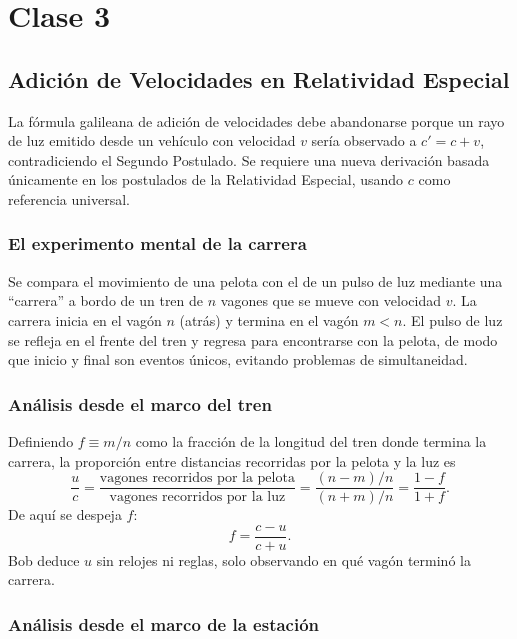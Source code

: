 \chapter{Clase 3}
\section{Adición de Velocidades en Relatividad Especial}

La fórmula galileana de adición de velocidades debe abandonarse porque un rayo de luz emitido desde un vehículo con velocidad $v$ sería observado a $c' = c + v$, contradiciendo el Segundo Postulado. Se requiere una nueva derivación basada únicamente en los postulados de la Relatividad Especial, usando $c$ como referencia universal.

\subsection{El experimento mental de la carrera}

Se compara el movimiento de una pelota con el de un pulso de luz mediante una ``carrera'' a bordo de un tren de $n$ vagones que se mueve con velocidad $v$. La carrera inicia en el vagón $n$ (atrás) y termina en el vagón $m < n$. El pulso de luz se refleja en el frente del tren y regresa para encontrarse con la pelota, de modo que inicio y final son eventos únicos, evitando problemas de simultaneidad.



\subsection{Análisis desde el marco del tren}

Definiendo $f \equiv m/n$ como la fracción de la longitud del tren donde termina la carrera, la proporción entre distancias recorridas por la pelota y la luz es
$$
\frac{u}{c} = \frac{\text{vagones recorridos por la pelota}}{\text{vagones recorridos por la luz}} = \frac{(n-m)/n}{(n+m)/n} = \frac{1 - f}{1 + f}.
$$
De aquí se despeja $f$:
\begin{equation*}
    f = \frac{c-u}{c+u}.
    \tag{3.1}
\end{equation*}
Bob deduce $u$ sin relojes ni reglas, solo observando en qué vagón terminó la carrera.

\subsection{Análisis desde el marco de la estación}

